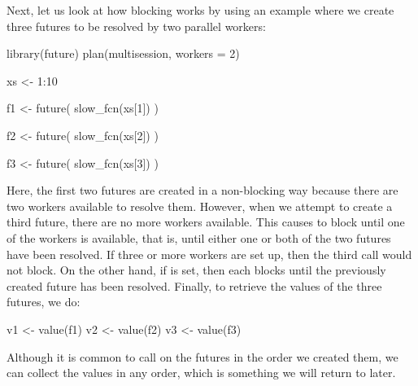 Next, let us look at how blocking works by using an example where we
create three futures to be resolved by two parallel workers:
%
\begin{example}
library(future)
plan(multisession, workers = 2)

xs <- 1:10

f1 <- future({
  slow_fcn(xs[1])
})

f2 <- future({
  slow_fcn(xs[2])
})

f3 <- future({
  slow_fcn(xs[3])
})
\end{example}
%
Here, the first two futures are created in a non-blocking way because
there are two workers available to resolve them.  However, when we
attempt to create a third future, there are no more workers available.
This causes
 to block until one of the workers is available, that is,
until either one or both of the two futures have been resolved.  If
three or more workers are set up, then the third  call
would not block.  On the other hand, if  is
set, then each  blocks until the previously created
future has been resolved.
%
Finally, to retrieve the values of the three futures, we do:
\begin{example}
v1 <- value(f1)
v2 <- value(f2)
v3 <- value(f3)
\end{example}
Although it is common to call  on the futures in the
order we created them, we can collect the values in any order, which
is something we will return to later.

